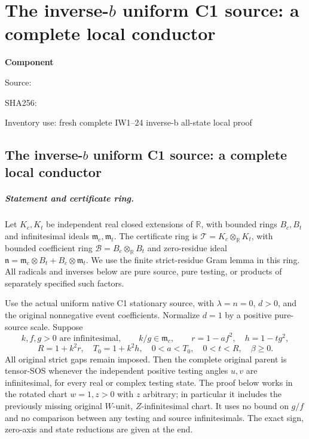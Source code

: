 \chapter{The inverse-$b$ uniform C1 source: a complete local conductor}
\label{component:pabbcd0905dcd}
\noindent\textbf{Component }\par
{\small\noindent Source: \par}
{\small\noindent SHA256: \par}
{\small\noindent Inventory use: fresh complete IW1--24 inverse-b all-state local proof\par}
\medskip
\section{The inverse-$b$ uniform C1 source: a complete local conductor}
\label{pabbcd0905dcd:sec:c1-inverse-b-local-new}

\paragraph{Statement and certificate ring.}
Let $K_c,K_t$ be independent real closed extensions of $\mathbb R$,
with bounded rings $B_c,B_t$ and infinitesimal ideals
$\mathfrak m_c,\mathfrak m_t$. The certificate ring is
$\mathcal T=K_c\otimes_{\mathbb R}K_t$, with bounded coefficient ring
$\mathcal B=B_c\otimes_{\mathbb R}B_t$ and zero-residue ideal
$\mathfrak n=\mathfrak m_c\otimes B_t+B_c\otimes\mathfrak m_t$.
We use the finite strict-residue Gram lemma in this ring.
All radicals and inverses below are pure source, pure testing, or
products of separately specified such factors.

Use the actual uniform native C1 stationary source, with
$\lambda=n=0$, $d>0$, and the original nonnegative event coefficients.
Normalize $d=1$ by a positive pure-source scale. Suppose
\[
 k,f,g>0\text{ are infinitesimal},\qquad k/g\in\mathfrak m_c,
 \qquad r=1-af^2,\quad h=1-tg^2,
\]
\[
 R=1+k^2r,\quad T_0=1+k^2h,\quad
 0<a<T_0,\quad 0<t<R,\quad \beta\geq0.                 \tag{IW1}
\]
All original strict gaps remain imposed. Then the complete original
parent is tensor-SOS whenever the independent positive testing angles
$u,v$ are infinitesimal, for every real or complex testing state.
The proof below works in the rotated chart $w=1,z>0$ with $z$ arbitrary;
in particular it includes the previously missing original
$W$-unit, $Z$-infinitesimal chart. It uses no bound on $g/f$ and no
comparison between any testing and source infinitesimals.
The exact sign, zero-axis and state reductions are given at the end.

